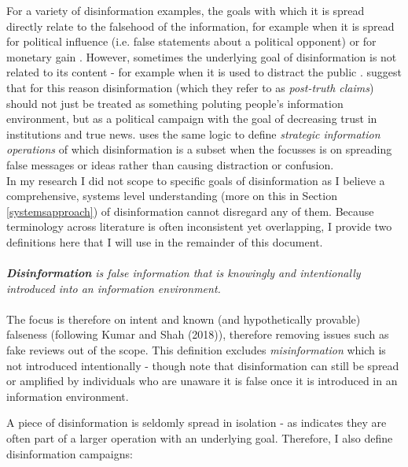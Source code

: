 \documentclass[10pt,a4paper]{article}
\begin{document}
For a variety of disinformation examples, the goals with which it is spread directly relate to the falsehood of the information, for example when it is spread for political influence (i.e. false statements about a political opponent) \citep{keller2020political} or for monetary gain \citep{hrvckova2019unravelling}. However, sometimes the underlying goal of disinformation is not related to its content - for example when it is used to distract the public \citep{king2017chinese}. \cite{lewandowsky2017beyond} suggest that for this reason disinformation (which they refer to as \textit{post-truth claims}) should not just be treated as something poluting people's information environment, but as a political campaign with the goal of decreasing trust in institutions and true news. \cite{Starbird2019} uses the same logic to define \textit{strategic information operations} of which disinformation is a subset when the focusses is on spreading false messages or ideas rather than causing distraction or confusion. \\

In my research I did not scope to specific goals of disinformation as I believe a comprehensive, systems level understanding (more on this in Section \ref{systemsapproach}) of disinformation cannot disregard any of them. Because terminology across literature is often inconsistent yet overlapping, I provide two definitions here that I will use in the remainder of this document.\\ \\

\textit{\textbf{Disinformation} is false information that is knowingly and intentionally introduced into an information environment.} \\ \\

The focus is therefore on intent \citep{Fallis2015} and known (and hypothetically provable) falseness (following Kumar and Shah (2018)), therefore removing issues such as fake reviews out of the scope. This definition excludes \textit{misinformation} which is not introduced intentionally - though note that disinformation can still be spread or amplified by individuals who are unaware it is false once it is introduced in an information environment.

A piece of disinformation is seldomly spread in isolation - as \cite{Starbird2019} indicates they are often part of a larger operation with an underlying goal. Therefore, I also define disinformation campaigns: \\ \\
\end{document}
